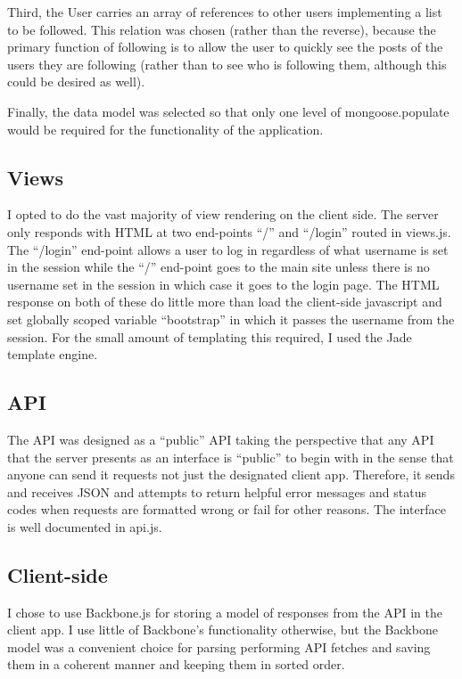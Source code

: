 \documentclass{amsart}
\begin{document}
Third, the User carries an array of references to other users implementing a list to be followed.
This relation was chosen (rather than the reverse), because the primary function of following
is to allow the user to quickly see the posts of the users they are following (rather than
to see who is following them, although this could be desired as well).

Finally, the data model was selected so that only one level of mongoose.populate would be required
for the functionality of the application.

\subsection{Views}
I opted to do the vast majority of view rendering on the client side. The server only
responds with HTML at two end-points ``/'' and ``/login'' routed in views.js.
The ``/login'' end-point
allows a user to log in regardless of what username is set in the session while the
``/'' end-point goes to the main site unless there is no username set in the session
in which case it goes to the login page. The HTML response on both of these do little
more than load the client-side javascript and set globally scoped variable ``bootstrap''
in which it passes the username from the session. For the small amount of templating
this required, I used the Jade template engine.


\subsection{API}
The API was designed as a ``public'' API taking the perspective that any API that the
server presents as an interface is ``public'' to begin with in the sense that anyone
can send it requests not just the designated client app. Therefore, it sends and
receives JSON and attempts to return helpful error messages and status codes when
requests are formatted wrong or fail for other reasons. The interface is well documented
in api.js.


\subsection{Client-side}
I chose to use Backbone.js for storing a model of responses from the API in the client app. I use
little of Backbone's functionality otherwise, but the Backbone model was a convenient choice for
parsing performing API fetches and saving them in a coherent manner and keeping them in sorted order.
\end{document}

